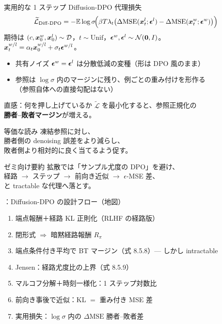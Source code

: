 \asmain
\begin{frame}{実用的な 1 ステップ Diffusion-DPO 代理損失}
    \[
        \widetilde{\mathcal{L}}_{\mathrm{Diff\text{-}DPO}}
        =
        -\mathbb{E}
        \log\sigma\!\Bigl(
        \beta T\lambda_t
        \bigl(
        \Delta\mathrm{MSE}(\bm{x}_t^l;\bm{\epsilon}^l)
        -
        \Delta\mathrm{MSE}(\bm{x}_t^w;\bm{\epsilon}^w)
        \bigr)
        \Bigr)
    \]
    期待は $(c,\bm{x}_0^w,\bm{x}_0^l)\sim\mathcal{D}$，$t\sim\mathrm{Unif}$，$\bm{\epsilon}^w,\bm{\epsilon}^l\sim\mathcal{N}(\bm{0},I)$。\\
    $\bm{x}_t^{w/l}=\alpha_t\bm{x}_0^{w/l}+\sigma_t\bm{\epsilon}^{w/l}$。
    \begin{itemize}
        \item 共有ノイズ $\bm{\epsilon}^w=\bm{\epsilon}^l$ は分散低減の変種（形は DPO 風のまま）
        \item 参照は $\log\sigma$ 内のマージンに残り、例ごとの重み付けを形作る\\
        （参照自体への直接勾配はない）
    \end{itemize}
\end{frame}
\asmain
\begin{frame}{直感：何を押し上げているか}
    $\widetilde{\mathcal{L}}$ を最小化すると、参照正規化の\\
    \textbf{勝者--敗者マージン}が増える。
    \begin{block}{等価な読み}
        凍結参照に対し、\\
        勝者側の denoising 誤差をより減らし、\\
        敗者側より相対的に良く当てるよう促す。
    \end{block}
    \begin{exampleblock}{ゼミ向け要約}
        拡散では「サンプル尤度の DPO」を避け、\\
        経路 $\to$ ステップ $\to$ 前向き近似 $\to$ $\epsilon$-MSE 差、\\
        と tractable な代理へ落とす。
    \end{exampleblock}
\end{frame}
\assuppl
\begin{frame}{\supplmark：Diffusion-DPO の設計フロー（地図）}
    \footnotesize
    \begin{enumerate}
        \item 端点報酬＋経路 KL 正則化（RLHF の経路版）
        \item 閉形式 $\Rightarrow$ 暗黙経路報酬 $R_{\pi}$
        \item 端点条件付き平均で BT マージン（式 8.5.8）--- しかし intractable
        \item Jensen：経路尤度比の上界（式 8.5.9）
        \item マルコフ分解＋時刻一様化：1 ステップ対数比
        \item 前向き事後で近似：KL $=$ 重み付き MSE 差
        \item 実用損失：$\log\sigma$ 内の $\Delta\mathrm{MSE}$ 勝者--敗者差
    \end{enumerate}
\end{frame}
